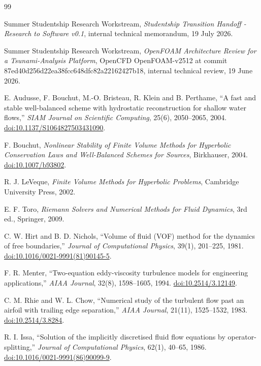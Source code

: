 \documentclass[11pt,a4paper]{article}
\begin{document}
\begin{thebibliography}{99}

Summer Studentship Research Workstream,
\emph{Studentship Transition Handoff - Research to Software v0.1},
internal technical memorandum, 19 July 2026.

Summer Studentship Research Workstream,
\emph{OpenFOAM Architecture Review for a Tsunami-Analysis Platform},
OpenCFD OpenFOAM-v2512 at commit 87ed40d256d22ea38fcc648dfc82a22162427b18,
internal technical review, 19 June 2026.

E. Audusse, F. Bouchut, M.-O. Bristeau, R. Klein and B. Perthame,
``A fast and stable well-balanced scheme with hydrostatic reconstruction for shallow water flows,''
\emph{SIAM Journal on Scientific Computing}, 25(6), 2050--2065, 2004.
\href{https://doi.org/10.1137/S1064827503431090}{doi:10.1137/S1064827503431090}.

F. Bouchut,
\emph{Nonlinear Stability of Finite Volume Methods for Hyperbolic Conservation Laws and Well-Balanced Schemes for Sources},
Birkhauser, 2004.
\href{https://doi.org/10.1007/b93802}{doi:10.1007/b93802}.

R. J. LeVeque,
\emph{Finite Volume Methods for Hyperbolic Problems},
Cambridge University Press, 2002.

E. F. Toro,
\emph{Riemann Solvers and Numerical Methods for Fluid Dynamics}, 3rd ed.,
Springer, 2009.

C. W. Hirt and B. D. Nichols,
``Volume of fluid (VOF) method for the dynamics of free boundaries,''
\emph{Journal of Computational Physics}, 39(1), 201--225, 1981.
\href{https://doi.org/10.1016/0021-9991(81)90145-5}{doi:10.1016/0021-9991(81)90145-5}.

F. R. Menter,
``Two-equation eddy-viscosity turbulence models for engineering applications,''
\emph{AIAA Journal}, 32(8), 1598--1605, 1994.
\href{https://doi.org/10.2514/3.12149}{doi:10.2514/3.12149}.

C. M. Rhie and W. L. Chow,
``Numerical study of the turbulent flow past an airfoil with trailing edge separation,''
\emph{AIAA Journal}, 21(11), 1525--1532, 1983.
\href{https://doi.org/10.2514/3.8284}{doi:10.2514/3.8284}.

R. I. Issa,
``Solution of the implicitly discretised fluid flow equations by operator-splitting,''
\emph{Journal of Computational Physics}, 62(1), 40--65, 1986.
\href{https://doi.org/10.1016/0021-9991(86)90099-9}{doi:10.1016/0021-9991(86)90099-9}.


\end{thebibliography}
\end{document}
